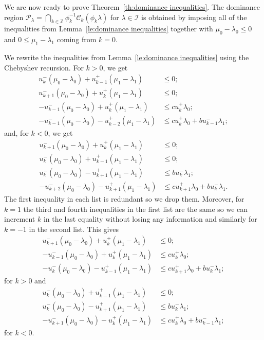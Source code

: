 \documentclass[pdflatex,sn-mathphys]{sn-jnl}%
\theoremstyle{thmstyleone}%
\theoremstyle{thmstyletwo}%
\theoremstyle{thmstylethree}%
\newcommand{\cC}{\mathcal{C}}
\newcommand{\cI}{\mathcal{I}}
\newcommand{\cP}{\mathcal{P}}
\newcommand{\ZZ}{\mathbb{Z}}
\begin{document}
  We are now ready to prove Theorem~\ref{th:dominance inequalities}.
  The dominance region $\cP_\lambda=\bigcap_{k\in\ZZ}\phi_k^{-1}\cC_k(\phi_k\lambda)$ for $\lambda\in\cI$ is obtained by imposing all of the inequalities from Lemma~\ref{le:dominance inequalities} together with $\mu_0 -\lambda_0 \le 0$ and $0 \le \mu_1 - \lambda_1$ coming from $k=0$.

  We rewrite the inequalities from Lemma~\ref{le:dominance inequalities} using the Chebyshev recursion.
  For $k>0$, we get
  \begin{align*}
    u_k^-(\mu_0-\lambda_0)+u_{k-1}^+(\mu_1-\lambda_1) &\le 0;\\
    u_{k+1}^-(\mu_0-\lambda_0)+u_k^+(\mu_1-\lambda_1) &\le 0;\\
    -u_{k-1}^-(\mu_0-\lambda_0)+u_k^+(\mu_1-\lambda_1) &\le cu_k^+\lambda_0;\\
    -u_{k-1}^-(\mu_0-\lambda_0)-u_{k-2}^+(\mu_1-\lambda_1) &\le cu_k^+\lambda_0+bu_{k-1}^-\lambda_1;
  \end{align*}
  and, for $k<0$, we get
  \begin{align*}
    u_{k+1}^-(\mu_0-\lambda_0)+u_k^+(\mu_1-\lambda_1) &\le 0;\\
    u_k^-(\mu_0-\lambda_0)+u_{k-1}^+(\mu_1-\lambda_1) &\le 0;\\
    u_k^-(\mu_0-\lambda_0)-u_{k+1}^+(\mu_1-\lambda_1) &\le bu_k^-\lambda_1;\\
    -u_{k+2}^-(\mu_0-\lambda_0)-u_{k+1}^+(\mu_1-\lambda_1) &\le cu_{k+1}^+\lambda_0+bu_k^-\lambda_1.
  \end{align*}
  The first inequality in each list is redundant so we drop them.
  Moreover, for $k=1$ the third and fourth inequalities in the first list are the same so we can increment $k$ in the last equality without losing any information and similarly for $k=-1$ in the second list. 
  This gives
  \begin{align*}
    u_{k+1}^-(\mu_0-\lambda_0)+u_k^+(\mu_1-\lambda_1) &\le 0;\\
    -u_{k-1}^-(\mu_0-\lambda_0)+u_k^+(\mu_1-\lambda_1) &\le cu_k^+\lambda_0;\\
    -u_k^-(\mu_0-\lambda_0)-u_{k-1}^+(\mu_1-\lambda_1) &\le cu_{k+1}^+\lambda_0+bu_k^-\lambda_1;
  \end{align*}
  for $k>0$ and
  \begin{align*}
    u_k^-(\mu_0-\lambda_0)+u_{k-1}^+(\mu_1-\lambda_1) &\le 0;\\
    u_k^-(\mu_0-\lambda_0)-u_{k+1}^+(\mu_1-\lambda_1) &\le bu_k^-\lambda_1;\\
    -u_{k+1}^-(\mu_0-\lambda_0)-u_k^+(\mu_1-\lambda_1) &\le cu_k^+\lambda_0+bu_{k-1}^-\lambda_1;
  \end{align*}
  for $k<0$.
\end{document}
